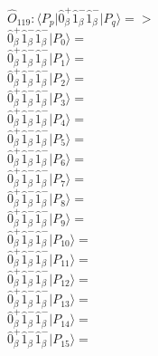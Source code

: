 \documentclass[14pt]{article}
\begin{document}
    $\hat{O}_{119}:  \langle{P_p}\vert \hat{0}_{\beta}^{+}\hat{1}_{\beta}^{-}\hat{1}_{\beta}^{-} \vert{P_q}\rangle => $ \\ 
    $ \hat{0}_{\beta}^{+}\hat{1}_{\beta}^{-}\hat{1}_{\beta}^{-} \vert{P_{0}}\rangle =  $ \\ 
    $ \hat{0}_{\beta}^{+}\hat{1}_{\beta}^{-}\hat{1}_{\beta}^{-} \vert{P_{1}}\rangle =  $ \\ 
    $ \hat{0}_{\beta}^{+}\hat{1}_{\beta}^{-}\hat{1}_{\beta}^{-} \vert{P_{2}}\rangle =  $ \\ 
    $ \hat{0}_{\beta}^{+}\hat{1}_{\beta}^{-}\hat{1}_{\beta}^{-} \vert{P_{3}}\rangle =  $ \\ 
    $ \hat{0}_{\beta}^{+}\hat{1}_{\beta}^{-}\hat{1}_{\beta}^{-} \vert{P_{4}}\rangle =  $ \\ 
    $ \hat{0}_{\beta}^{+}\hat{1}_{\beta}^{-}\hat{1}_{\beta}^{-} \vert{P_{5}}\rangle =  $ \\ 
    $ \hat{0}_{\beta}^{+}\hat{1}_{\beta}^{-}\hat{1}_{\beta}^{-} \vert{P_{6}}\rangle =  $ \\ 
    $ \hat{0}_{\beta}^{+}\hat{1}_{\beta}^{-}\hat{1}_{\beta}^{-} \vert{P_{7}}\rangle =  $ \\ 
    $ \hat{0}_{\beta}^{+}\hat{1}_{\beta}^{-}\hat{1}_{\beta}^{-} \vert{P_{8}}\rangle =  $ \\ 
    $ \hat{0}_{\beta}^{+}\hat{1}_{\beta}^{-}\hat{1}_{\beta}^{-} \vert{P_{9}}\rangle =  $ \\ 
    $ \hat{0}_{\beta}^{+}\hat{1}_{\beta}^{-}\hat{1}_{\beta}^{-} \vert{P_{10}}\rangle =  $ \\ 
    $ \hat{0}_{\beta}^{+}\hat{1}_{\beta}^{-}\hat{1}_{\beta}^{-} \vert{P_{11}}\rangle =  $ \\ 
    $ \hat{0}_{\beta}^{+}\hat{1}_{\beta}^{-}\hat{1}_{\beta}^{-} \vert{P_{12}}\rangle =  $ \\ 
    $ \hat{0}_{\beta}^{+}\hat{1}_{\beta}^{-}\hat{1}_{\beta}^{-} \vert{P_{13}}\rangle =  $ \\ 
    $ \hat{0}_{\beta}^{+}\hat{1}_{\beta}^{-}\hat{1}_{\beta}^{-} \vert{P_{14}}\rangle =  $ \\ 
    $ \hat{0}_{\beta}^{+}\hat{1}_{\beta}^{-}\hat{1}_{\beta}^{-} \vert{P_{15}}\rangle =  $ \\ 
    
\end{document}
